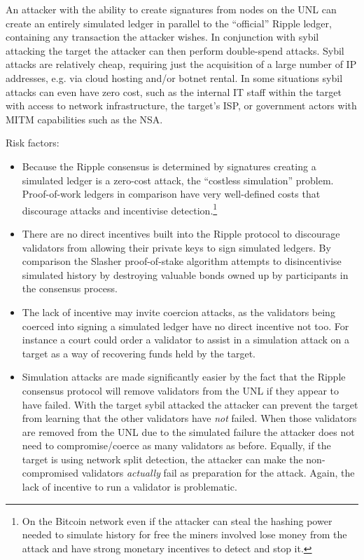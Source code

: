 \documentclass{article}
\begin{document}
An attacker with the ability to create signatures from nodes on the UNL can
create an entirely simulated ledger in parallel to the ``official'' Ripple
ledger, containing any transaction the attacker wishes. In conjunction with
sybil attacking the target the attacker can then perform double-spend attacks.
Sybil attacks are relatively cheap, requiring just the acquisition of a large
number of IP addresses, e.g. via cloud hosting and/or botnet rental. In some
situations sybil attacks can even have zero cost, such as the internal IT staff
within the target with access to network infrastructure, the target's ISP, or
government actors with MITM capabilities such as the
NSA.\cite{schneier-nsa-mitm}

Risk factors:

\begin{itemize}

    \item Because the Ripple consensus is determined by signatures creating a
        simulated ledger is a zero-cost attack, the ``costless
        simulation''\cite[4.2]{apoelstra-on-stake} problem. Proof-of-work
        ledgers in comparison have very well-defined costs that discourage
        attacks and incentivise detection.\footnote{On the Bitcoin network even
            if the attacker can steal the hashing power needed to simulate
        history for free the miners involved lose money from the attack and
    have strong monetary incentives to detect and stop it.}

    \item There are no direct incentives built into the Ripple protocol to
        discourage validators from allowing their private keys to sign
        simulated ledgers. By comparison the Slasher proof-of-stake algorithm
        attempts to disincentivise simulated history by destroying valuable
        bonds owned up by participants in the consensus
        process.\cite{ethereum-blog-slasher}

    \item The lack of incentive may invite coercion attacks, as the validators
        being coerced into signing a simulated ledger have no direct incentive
        not too. For instance a court could order a validator to assist in a
        simulation attack on a target as a way of recovering funds held by the
        target.

    \item Simulation attacks are made significantly easier by the fact that the
        Ripple consensus protocol will remove validators from the UNL if they
        appear to have failed.\cite[3.4.2]{ripple-consensus-paper} With the
        target sybil attacked the attacker can prevent the target from learning
        that the other validators have \emph{not} failed. When those validators
        are removed from the UNL due to the simulated failure the attacker does
        not need to compromise/coerce as many validators as before. Equally, if
        the target is using network split detection, the attacker can make the
        non-compromised validators \emph{actually} fail as preparation for the
        attack. Again, the lack of incentive to run a validator is problematic.


\end{itemize}
\end{document}
